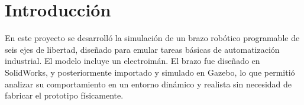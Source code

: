 \chapter{Introducción} \label{chap:introduccion}

En este proyecto se desarrolló la simulación de un brazo robótico programable de seis ejes de libertad, diseñado para emular tareas básicas de automatización industrial. El modelo incluye un electroimán.
El brazo fue diseñado en SolidWorks, y posteriormente importado y simulado en Gazebo, lo que permitió analizar su comportamiento en un entorno dinámico y realista sin necesidad de fabricar el prototipo físicamente.